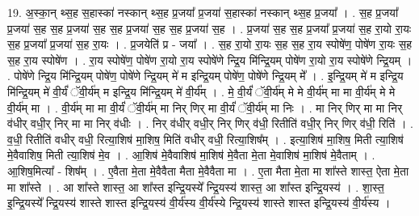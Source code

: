\documentclass[17pt]{extarticle}
\begin{document}
19. अ॒स्का॒न् थ्स॒ह स॒हास्का॑ नस्कान् थ्स॒ह प्र॒जया᳚ प्र॒जया॑ स॒हास्का॑ नस्कान् थ्स॒ह प्र॒जया᳚ । . स॒ह प्र॒जया᳚ प्र॒जया॑ स॒ह स॒ह प्र॒जया॑ स॒ह स॒ह प्र॒जया॑ स॒ह स॒ह प्र॒जया॑ स॒ह । . प्र॒जया॑ स॒ह स॒ह प्र॒जया᳚ प्र॒जया॑ स॒ह रा॒यो रा॒यः स॒ह प्र॒जया᳚ प्र॒जया॑ स॒ह रा॒यः । . प्र॒जयेति॑ प्र - जया᳚ । . स॒ह रा॒यो रा॒यः स॒ह स॒ह रा॒य स्पोषे॑ण॒ पोषे॑ण रा॒यः स॒ह स॒ह रा॒य स्पोषे॑ण । . रा॒य स्पोषे॑ण॒ पोषे॑ण रा॒यो रा॒य स्पोषे॑णे न्द्रि॒य मि॑न्द्रि॒यम् पोषे॑ण रा॒यो रा॒य स्पोषे॑णे न्द्रि॒यम् । . पोषे॑णे न्द्रि॒य मि॑न्द्रि॒यम् पोषे॑ण॒ पोषे॑णे न्द्रि॒यम् मे॑ म इन्द्रि॒यम् पोषे॑ण॒ पोषे॑णे न्द्रि॒यम् मे᳚ । . इ॒न्द्रि॒यम् मे॑ म इन्द्रि॒य मि॑न्द्रि॒यम् मे॑ वी॒र्यं॑ ॅवी॒र्य॑म् म इन्द्रि॒य मि॑न्द्रि॒यम् मे॑ वी॒र्य᳚म् । . मे॒ वी॒र्यं॑ ॅवी॒र्य॑म् मे मे वी॒र्य॑म् मा मा वी॒र्य॑म् मे मे वी॒र्य॑म् मा । . वी॒र्य॑म् मा मा वी॒र्यं॑ ॅवी॒र्य॑म् मा निर् णिर् मा वी॒र्यं॑ ॅवी॒र्य॑म् मा निः । . मा निर् णिर् मा मा निर् व॑धीर् वधी॒र् निर् मा मा निर् व॑धीः । . निर् व॑धीर् वधी॒र् निर् णिर् व॑धी॒ रितीति॑ वधी॒र् निर् णिर् व॑धी॒ रिति॑ । . व॒धी॒ रितीति॑ वधीर् वधी॒ रित्या॒शिष॑ मा॒शिष॒ मिति॑ वधीर् वधी॒ रित्या॒शिष᳚म् । . इत्या॒शिष॑ मा॒शिष॒ मिती त्या॒शिष॑ मे॒वैवाशिष॒ मिती त्या॒शिष॑ मे॒व । . आ॒शिष॑ मे॒वैवाशिष॑ मा॒शिष॑ मे॒वैता मे॒ता मे॒वाशिष॑ मा॒शिष॑ मे॒वैताम् । . आ॒शिष॒मित्या᳚ - शिष᳚म् । . ए॒वैता मे॒ता मे॒वैवैता मैता मे॒वैवैता मा । . ए॒ता मैता मे॒ता मा शा᳚स्ते शास्त॒ ऐता मे॒ता मा शा᳚स्ते । . आ शा᳚स्ते शास्त॒ आ शा᳚स्त इन्द्रि॒यस्ये᳚ न्द्रि॒यस्य॑ शास्त॒ आ शा᳚स्त इन्द्रि॒यस्य॑ । . शा॒स्त॒ इ॒न्द्रि॒यस्ये᳚ न्द्रि॒यस्य॑ शास्ते शास्त इन्द्रि॒यस्य॑ वी॒र्य॑स्य वी॒र्य॑स्ये न्द्रि॒यस्य॑ शास्ते शास्त इन्द्रि॒यस्य॑ वी॒र्य॑स्य । \newline
\end{document}
